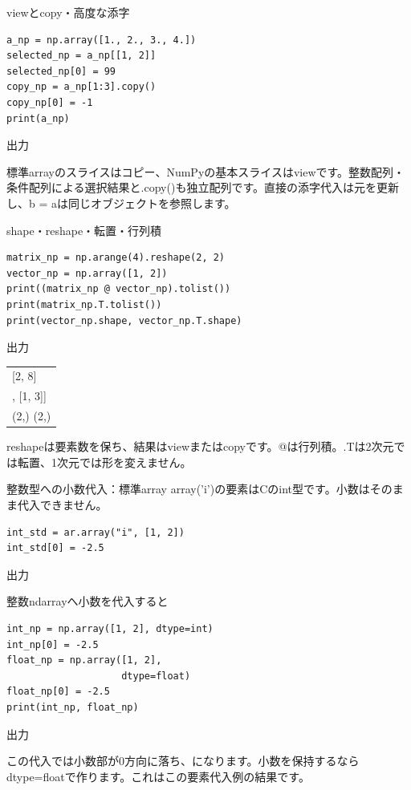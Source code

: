 \documentclass[12pt,aspectratio=43]{beamer}
\newcommand{\code}[1]{{\codefont #1}}
\newcommand{\out}[1]{%
  \par\vspace{.5mm}\noindent
  {\small\textcolor{black!60}{出力}}\hspace{1mm}%
  \begin{minipage}[t]{.88\linewidth}\vspace{0pt}%
    {\codefont\fontsize{11}{12.5}\selectfont #1}%
  \end{minipage}\par}
\begin{document}
\begin{frame}[t,fragile]{viewとcopy・高度な添字}
\begin{lstlisting}
a_np = np.array([1., 2., 3., 4.])
selected_np = a_np[[1, 2]]
selected_np[0] = 99
copy_np = a_np[1:3].copy()
copy_np[0] = -1
print(a_np)
\end{lstlisting}
  \out{[1. 2. 3. 4.]}
  \small 標準\code{array}のスライスはコピー、NumPyの基本スライスはviewです。整数配列・条件配列による選択結果と\code{.copy()}も独立配列です。直接の添字代入は元を更新し、\code{b = a}は同じオブジェクトを参照します。
\end{frame}

\begin{frame}[t,fragile]{\code{shape}・\code{reshape}・転置・行列積}
\begin{lstlisting}
matrix_np = np.arange(4).reshape(2, 2)
vector_np = np.array([1, 2])
print((matrix_np @ vector_np).tolist())
print(matrix_np.T.tolist())
print(vector_np.shape, vector_np.T.shape)
\end{lstlisting}
  \out{\begin{tabular}{@{}l@{}}
    [2, 8]\\\relax
    [[0, 2], [1, 3]]\\
    (2,) (2,)
  \end{tabular}}
  \small \code{reshape}は要素数を保ち、結果はviewまたはcopyです。\code{@}は行列積。\code{.T}は2次元では転置、1次元では形を変えません。
\end{frame}

\begin{frame}[t,fragile]{整数型への小数代入：標準\code{array}}
  \small \code{array('i')}の要素はCのint型です。小数はそのまま代入できません。
\begin{lstlisting}
int_std = ar.array("i", [1, 2])
int_std[0] = -2.5
\end{lstlisting}
  \out{\code{TypeError}}
\end{frame}

\begin{frame}[t,fragile]{整数\code{ndarray}へ小数を代入すると}
\begin{lstlisting}
int_np = np.array([1, 2], dtype=int)
int_np[0] = -2.5
float_np = np.array([1, 2],
                    dtype=float)
float_np[0] = -2.5
print(int_np, float_np)
\end{lstlisting}
  \out{[-2  2] [-2.5  2. ]}
  \small この代入では小数部が0方向に落ち、\code{-2}になります。小数を保持するなら\code{dtype=float}で作ります。これはこの要素代入例の結果です。
\end{frame}
\end{document}
